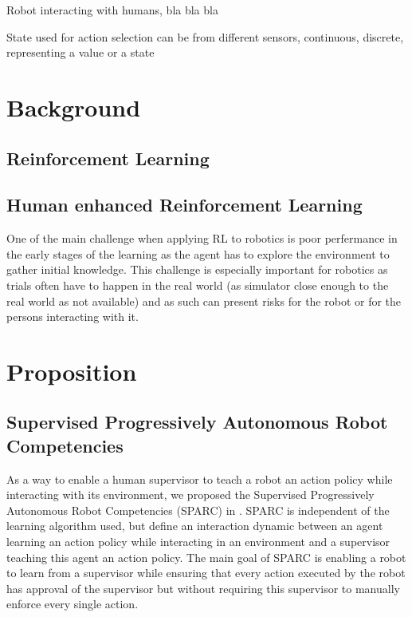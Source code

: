 \documentclass[letterpaper]{article} %
\begin{document}
Robot interacting with humans, bla bla bla

State used for action selection can be from different sensors, continuous, discrete, representing a value or a state

\cite{kober2013reinforcement}

\section{Background}
\subsection{Reinforcement Learning}
\subsection{Human enhanced Reinforcement Learning}
One of the main challenge when applying RL to robotics is poor perfermance in
 the early stages of the learning as the agent has to explore the environment to
 gather initial knowledge. This challenge is especially
important for robotics as trials often have to happen in the real world (as
simulator close enough to the real world as not available) and as such can
present risks for the robot or for the persons interacting with it. 


\section{Proposition}
\subsection{Supervised Progressively Autonomous Robot Competencies}

As a way to enable a human supervisor to teach a robot an action policy while
interacting with its environment, we proposed the Supervised Progressively
Autonomous Robot Competencies (SPARC) in \cite{senft2015sparc}. SPARC is independent
of the learning algorithm used, but define an interaction dynamic between an
agent learning an action policy while interacting in an environment and a
supervisor teaching this agent an action policy. The main goal of SPARC is
enabling a robot to learn from a supervisor while ensuring that every action
executed by the robot has approval of the supervisor but without requiring this
supervisor to manually enforce every single action.
\end{document}
